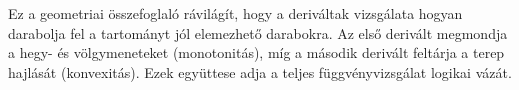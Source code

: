 \documentclass[12pt,a4paper]{article}
\begin{document}
Ez a geometriai összefoglaló rávilágít, hogy a deriváltak vizsgálata hogyan darabolja fel a tartományt jól elemezhető darabokra. Az első derivált megmondja a hegy- és völgymeneteket (monotonitás), míg a második derivált feltárja a terep hajlását (konvexitás). Ezek együttese adja a teljes függvényvizsgálat logikai vázát.
\end{document}
